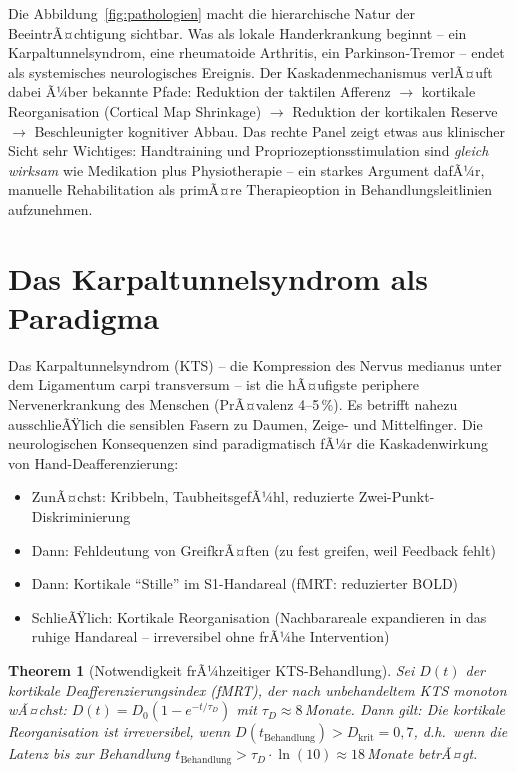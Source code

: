 ﻿\documentclass[12pt,a4paper]{report}
\theoremstyle{plain}
\newtheorem{theorem}{Theorem}[section]
\theoremstyle{definition}
\theoremstyle{remark}
\begin{document}
Die Abbildung~\ref{fig:pathologien} macht die hierarchische Natur der BeeintrÃ¤chtigung
sichtbar. Was als lokale Handerkrankung beginnt -- ein Karpaltunnelsyndrom,
eine rheumatoide Arthritis, ein Parkinson-Tremor -- endet als systemisches
neurologisches Ereignis. Der Kaskadenmechanismus verlÃ¤uft dabei Ã¼ber bekannte
Pfade: Reduktion der taktilen Afferenz $\to$ kortikale Reorganisation
(Cortical Map Shrinkage) $\to$ Reduktion der kortikalen Reserve $\to$
Beschleunigter kognitiver Abbau. Das rechte Panel zeigt etwas aus klinischer
Sicht sehr Wichtiges: Handtraining und Propriozeptionsstimulation sind
\emph{gleich wirksam} wie Medikation plus Physiotherapie -- ein starkes
Argument dafÃ¼r, manuelle Rehabilitation als primÃ¤re Therapieoption in
Behandlungsleitlinien aufzunehmen.

\section{Das Karpaltunnelsyndrom als Paradigma}

Das Karpaltunnelsyndrom (KTS) -- die Kompression des Nervus medianus unter
dem Ligamentum carpi transversum -- ist die hÃ¤ufigste periphere Nervenerkrankung
des Menschen (PrÃ¤valenz 4--5\,\%). Es betrifft nahezu ausschlieÃŸlich die
sensiblen Fasern zu Daumen, Zeige- und Mittelfinger. Die neurologischen
Konsequenzen sind paradigmatisch fÃ¼r die Kaskadenwirkung von Hand-Deafferenzierung:

\begin{itemize}
\item ZunÃ¤chst: Kribbeln, TaubheitsgefÃ¼hl, reduzierte Zwei-Punkt-Diskriminierung
\item Dann: Fehldeutung von GreifkrÃ¤ften (zu fest greifen, weil Feedback fehlt)
\item Dann: Kortikale ``Stille'' im S1-Handareal (fMRT: reduzierter BOLD)
\item SchlieÃŸlich: Kortikale Reorganisation (Nachbarareale expandieren in
  das ruhige Handareal -- irreversibel ohne frÃ¼he Intervention)
\end{itemize}

\begin{theorem}[Notwendigkeit frÃ¼hzeitiger KTS-Behandlung]
\label{thm:kts}
Sei $D(t)$ der kortikale Deafferenzierungsindex (fMRT), der nach unbehandeltem
KTS monoton wÃ¤chst: $D(t) = D_0(1 - e^{-t/\tau_D})$ mit $\tau_D \approx 8$\,Monate.
Dann gilt: Die kortikale Reorganisation ist irreversibel, wenn
$D(t_{\text{Behandlung}}) > D_{\text{krit}} = 0{,}7$, d.h.\ wenn die
Latenz bis zur Behandlung $t_{\text{Behandlung}} > \tau_D \cdot \ln(10) \approx 18$\,Monate
betrÃ¤gt.
\end{theorem}
\end{document}
